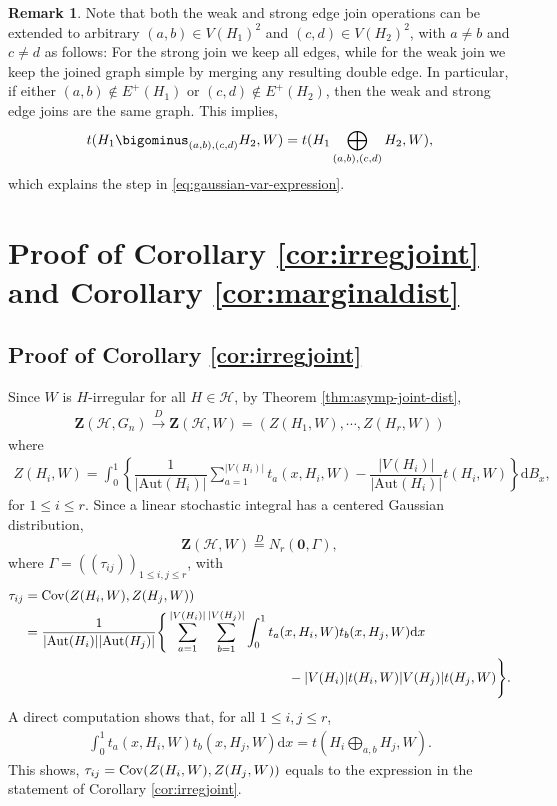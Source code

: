\documentclass[11pt,reqno]{amsart}
\numberwithin{equation}{section}
\newcommand{\cH}{{\mathcal H}}
\newcommand\dto{\overset{D}{\rightarrow}}
\theoremstyle{definition}
\newtheorem{remark}{Remark}[section]
\def\Cov{{\rm Cov}}
\begin{document}
\begin{remark}\label{rem:def_ext_join} 
Note that 
both the {weak} and {strong} edge join
operations can be extended to arbitrary $(a,b)\in V(H_{1})^{2}$ and $(c,d)\in
V(H_{2})^2$,  with $ a\neq b$ and $ c\neq d$ as follows: For the strong join we keep all edges, while for the weak join we keep the joined graph simple by merging any resulting double edge. In particular, if either $(a,b)\not\in E^{+}(H_{1})$ or $(c,d)\not\in
E^{+}(H_{2})$, then the {weak} and {strong} edge joins are the same graph. This implies, 
$$t(H_{1}\bigominus_{(a,b),(c,d)}H_{2},W) = t(H_{1}\bigoplus_{(a,b),(c,d)}H_{2},W) , $$
which explains the step in \eqref{eq:gaussian-var-expression}. 
\end{remark}



\section{Proof of Corollary \ref{cor:irregjoint} and Corollary \ref{cor:marginaldist}}\label{sec:proofofmarginaldist}



\subsection{Proof of Corollary \ref{cor:irregjoint}} 

Since $W$ is $H$-irregular for all $H \in \mathcal H$, by Theorem \ref{thm:asymp-joint-dist}, 
\begin{align*}
    \bm Z(\cH, G_n)\dto \bm Z(\cH, W) = (Z(H_{1},W),\cdots, Z(H_{r},W))
\end{align*}
where 
\begin{align*}
    Z(H_{i},W) = \int_{0}^{1} \left\{ \dfrac{1}{|\mathrm{Aut}(H_{i})|}\sum_{a=1}^{|V(H_{i})|}t_{a}(x,H_{i},W) - \dfrac{|V(H_{i})|}{|\mathrm{Aut}(H_{i})|}t(H_{i},W) \right\} \mathrm d B_{x} ,  
\end{align*} 
for $1\leq i\leq r$. Since a linear stochastic integral has a centered Gaussian distribution, $$\bm Z(\cH, W) \stackrel{D}= N_r( \bm 0, \Gamma),$$ where $\Gamma = (( \tau_{ij} ))_{1 \leq i, j \leq r}$, with  
\begin{align*}
\tau_{ij}  & =    \Cov(Z(H_{i},W),Z(H_{j},W)) \\ 
    & = \dfrac{1}{|\mathrm{Aut}(H_{i})| |\mathrm{Aut}(H_{j})|} \Bigg\{ \sum_{a=1}^{|V(H_{i})|}\sum_{b=1}^{|V(H_{j})|}\int_0^1 t_{a}(x,H_{i},W)t_{b}(x,H_{j},W)\mathrm{d}x   \\ 
      & \hspace{2.75in} - |V(H_{i})| t(H_{i},W) |V(H_{j})| t(H_{j},W) \Bigg \}.
\end{align*} 
A direct computation shows that, for all $1\leq i,j\leq r$,
\begin{align*}
    \int_0^1 t_{a}(x,H_{i},W)t_{b}(x,H_{j},W)\mathrm{d}x = t\left(H_i\bigoplus_{a,b}H_j,W\right) . 
\end{align*}
This shows, $\tau_{ij} = \Cov(Z(H_{i},W),Z(H_{j},W))$ equals to the expression in the statement of Corollary \ref{cor:irregjoint}. 
\end{document}
